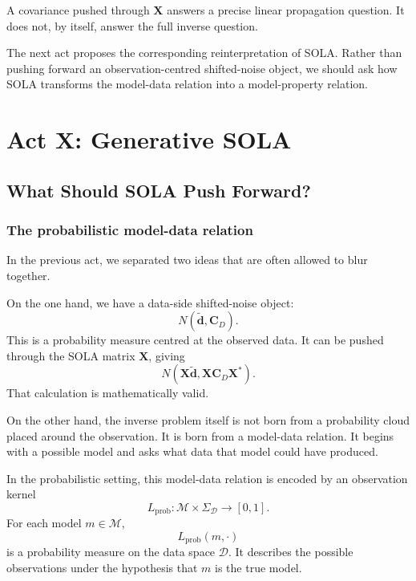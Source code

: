 \documentclass[11pt,openany]{book}
\theoremstyle{definition}
\theoremstyle{remark}
\newcommand{\M}{\mathcal M}
\newcommand{\D}{\mathcal D}
\begin{document}
\begin{lessonbox}
A covariance pushed through \(\mathbf X\) answers a precise linear propagation question. It does
not, by itself, answer the full inverse question.
\end{lessonbox}

The next act proposes the corresponding reinterpretation of SOLA. Rather than pushing forward
an observation-centred shifted-noise object, we should ask how SOLA transforms the model-data
relation into a model-property relation.



\part{Act X: Generative SOLA}

\chapter{What Should SOLA Push Forward?}

\section{The probabilistic model-data relation}

In the previous act, we separated two ideas that are often allowed to blur together.

On the one hand, we have a data-side shifted-noise object:
\[
  N(\widetilde{\mathbf d},\mathbf C_D).
\]
This is a probability measure centred at the observed data. It can be pushed through the SOLA
matrix \(\mathbf X\), giving
\[
  N(\mathbf X\widetilde{\mathbf d},\mathbf X\mathbf C_D\mathbf X^*).
\]
That calculation is mathematically valid.

On the other hand, the inverse problem itself is not born from a probability cloud placed around
the observation. It is born from a model-data relation. It begins with a possible model and asks
what data that model could have produced.

In the probabilistic setting, this model-data relation is encoded by an observation kernel
\[
  L_{\mathrm{prob}}:\M\times\Sigma_{\D}\to[0,1].
\]
For each model \(m\in\M\),
\[
  L_{\mathrm{prob}}(m,\cdot)
\]
is a probability measure on the data space \(\D\). It describes the possible observations under
the hypothesis that \(m\) is the true model.
\end{document}
